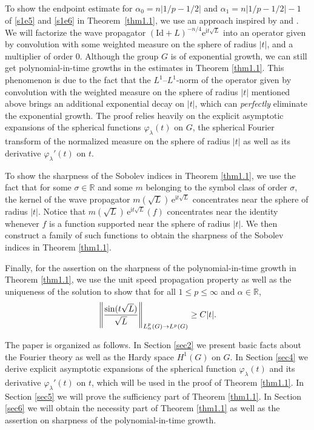\documentclass[a4paper,12pt]{amsart}
\numberwithin{equation}{section}
\theoremstyle{definition}
\theoremstyle{remark}
\numberwithin{theorem}{section}
\newcommand{\R}{\mathbb{R}}
\newcommand{\e}{\mathrm{e}}
\newcommand{\Id}{\mathrm{Id}}
\renewcommand{\i}{\mathrm{i}}
\begin{document}
To show the endpoint estimate for $\alpha_0=n|{1/p}-{1/2}|$ and $\alpha_1=n|{1/p}-{1/2}|-1$ of \eqref{s1e5} and \eqref{s1e6} in Theorem~\ref{thm1.1}, we use an approach inspired by \cite{Pe} and \cite{Ta2}. We will factorize the wave propagator $(\Id+L)^{-n/4}\e^{\i t\sqrt{L}}$ into an operator given by convolution with some weighted measure on the sphere of radius $|t|$, and a multiplier of order $0$. Although the group $G$ is of exponential growth, we can still get polynomial-in-time growths in the estimates in Theorem \ref{thm1.1}. This phenomenon is due to the fact that the $L^1$--$L^1$-norm of the operator given by convolution with the weighted measure on the sphere of radius $|t|$ mentioned above brings an additional exponential decay on $|t|$, which can \emph{perfectly} eliminate the exponential growth. The proof relies heavily on the explicit asymptotic expansions of the spherical functions $\varphi_\lambda(t)$ on $G$, the spherical Fourier transform of the normalized measure on the sphere of radius $|t|$ as well as its derivative $\varphi_\lambda'(t)$ on $t$.

To show the sharpness of the Sobolev indices in Theorem \ref{thm1.1}, we use the fact that for some $\sigma\in\R$ and some $m$ belonging to the symbol class of order $\sigma$, the kernel of the wave propagator $m(\sqrt{L})\,\e^{\i t\sqrt{L}}$ concentrates near the sphere of radius $|t|$. Notice that $m(\sqrt{L})\, \e^{\i t\sqrt{L}}(f)$ concentrates near the identity whenever $f$ is a function supported near the sphere of radius $|t|$. We then construct a family of such functions to obtain the sharpness of the Sobolev indices in Theorem \ref{thm1.1}.

Finally, for the assertion on the sharpness of the polynomial-in-time growth in Theorem \ref{thm1.1}, we use the unit speed propagation property as well as the uniqueness of the solution to show that for all $1\leq p\leq\infty$ and $\alpha\in\R$,
\begin{align*}
\left\|{\sin(t\sqrt{L})\over\sqrt{L}}\right\|_{L^p_\alpha(G)\to L^p(G)}\geq C|t|.
\end{align*}
\smallskip

The paper is organized as follows. In Section \ref{sec2} we present basic facts about the Fourier theory as well as the Hardy space $H^1(G)$ on $G$. In Section \ref{sec4} we derive explicit asymptotic expansions of the spherical function $\varphi_\lambda(t)$ and its derivative $\varphi_\lambda'(t)$ on $t$, which will be used in the proof of Theorem \ref{thm1.1}. In Section \ref{sec5} we will prove the sufficiency part of Theorem \ref{thm1.1}. In Section \ref{sec6} we will obtain the necessity part of Theorem \ref{thm1.1} as well as the assertion on sharpness of the polynomial-in-time growth.
\medskip
\end{document}
